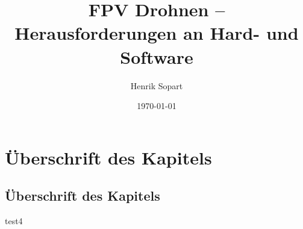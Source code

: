 \documentclass[a4paper,11pt]{scrartcl}
\title{FPV Drohnen – Herausforderungen an Hard- und Software}
\author{Henrik Sopart}
\date{\today}
\begin{document}
\maketitle
\newpage
\tableofcontents
\newpage
\section[Überschrift für das Inhaltsverzeichnis]{Überschrift des Kapitels}
\subsection[Überschrift für das Inhaltsverzeichnis]{Überschrift des Kapitels}

test4
\end{document}
